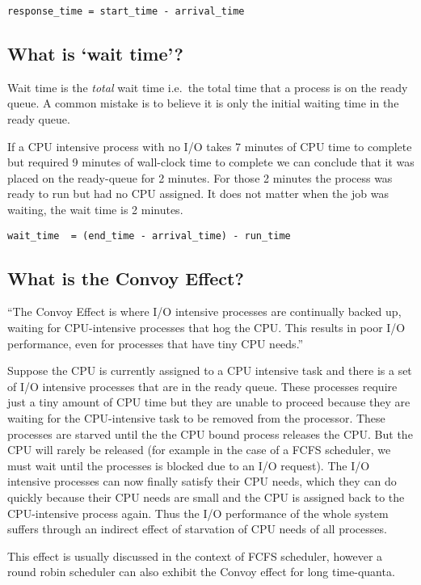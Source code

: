 \texttt{response\_time\ =\ start\_time\ -\ arrival\_time}

\subsection{\texorpdfstring{What is `wait
time'?}{What is wait time?}}\label{what-is-wait-time}

Wait time is the \emph{total} wait time i.e.~the total time that a
process is on the ready queue. A common mistake is to believe it is only
the initial waiting time in the ready queue.

If a CPU intensive process with no I/O takes 7 minutes of CPU time to
complete but required 9 minutes of wall-clock time to complete we can
conclude that it was placed on the ready-queue for 2 minutes. For those
2 minutes the process was ready to run but had no CPU assigned. It does
not matter when the job was waiting, the wait time is 2 minutes.

\texttt{wait\_time\ \ =\ (end\_time\ -\ arrival\_time)\ -\ run\_time}

\subsection{What is the Convoy Effect?}\label{what-is-the-convoy-effect}

``The Convoy Effect is where I/O intensive processes are continually
backed up, waiting for CPU-intensive processes that hog the CPU. This
results in poor I/O performance, even for processes that have tiny CPU
needs.''

Suppose the CPU is currently assigned to a CPU intensive task and there
is a set of I/O intensive processes that are in the ready queue. These
processes require just a tiny amount of CPU time but they are unable to
proceed because they are waiting for the CPU-intensive task to be
removed from the processor. These processes are starved until the the
CPU bound process releases the CPU. But the CPU will rarely be released
(for example in the case of a FCFS scheduler, we must wait until the
processes is blocked due to an I/O request). The I/O intensive processes
can now finally satisfy their CPU needs, which they can do quickly
because their CPU needs are small and the CPU is assigned back to the
CPU-intensive process again. Thus the I/O performance of the whole
system suffers through an indirect effect of starvation of CPU needs of
all processes.

This effect is usually discussed in the context of FCFS scheduler,
however a round robin scheduler can also exhibit the Convoy effect for
long time-quanta.

